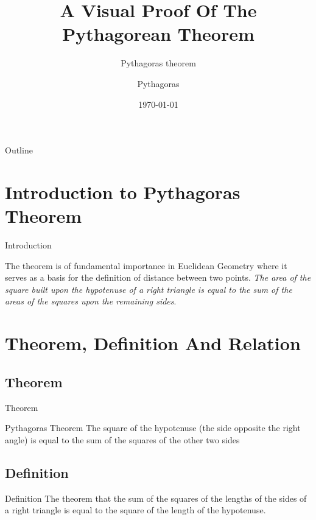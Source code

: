\documentclass[10pt]{beamer}
\title[Pythagoras theorem 3]{A Visual Proof Of The Pythagorean Theorem}
\subtitle{Pythagoras theorem}
\author[Pythagoras of Samos]{Pythagoras}
\date{\today}
\begin{document}
\begin{frame}
	\titlepage			%
\end{frame}

\begin{frame}{Outline}
	\transfade
	\tableofcontents
\end{frame}

\section{Introduction to Pythagoras Theorem}

\begin{frame}{Introduction}
\label{sec:intro}

\transdissolve
The theorem is of fundamental importance in Euclidean Geometry where it serves 
as a basis for the definition of distance between two points.
\emph{The area of the square built upon the hypotenuse of a right
triangle is equal to the sum of the areas of the squares upon the
remaining sides}.
\end{frame}

\section{Theorem, Definition And Relation}
\label{sec:def}
\subsection{Theorem}
\begin{frame}{Theorem}
\begin{block}{Pythagoras Theorem}
\transfade
The square of the hypotenuse (the side opposite the right angle) is equal to the sum of the squares of the other two sides
\end{block}
\end{frame}

\subsection{Definition}
\begin{frame}{Definition}
\transfade
The theorem that the sum of the squares of the lengths of the sides of a right triangle is equal to the square of the length of the hypotenuse.
\end{frame}
\end{document}
